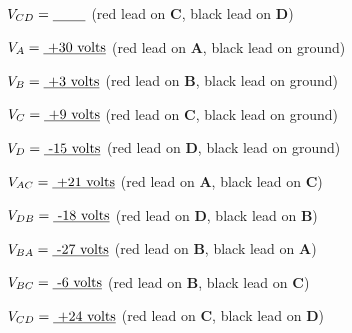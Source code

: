 \vskip 5pt

$V_{CD} = \hbox{\underbar{ \hskip 20pt}}$ (red lead on {\bf C}, black lead on {\bf D})







$V_A = \hbox{\underbar{ +30 volts}}$ (red lead on {\bf A}, black lead on ground)

\vskip 5pt

$V_B = \hbox{\underbar{ +3 volts}}$ (red lead on {\bf B}, black lead on ground)

\vskip 5pt

$V_C = \hbox{\underbar{ +9 volts}}$ (red lead on {\bf C}, black lead on ground)

\vskip 5pt

$V_D = \hbox{\underbar{ -15 volts}}$ (red lead on {\bf D}, black lead on ground)

\vskip 20pt

\goodbreak

$V_{AC} = \hbox{\underbar{ +21 volts}}$ (red lead on {\bf A}, black lead on {\bf C})

\vskip 5pt

$V_{DB} = \hbox{\underbar{ -18 volts}}$ (red lead on {\bf D}, black lead on {\bf B})

\vskip 5pt

$V_{BA} = \hbox{\underbar{ -27 volts}}$ (red lead on {\bf B}, black lead on {\bf A})

\vskip 5pt

$V_{BC} = \hbox{\underbar{ -6 volts}}$ (red lead on {\bf B}, black lead on {\bf C})

\vskip 5pt

$V_{CD} = \hbox{\underbar{ +24 volts}}$ (red lead on {\bf C}, black lead on {\bf D})












